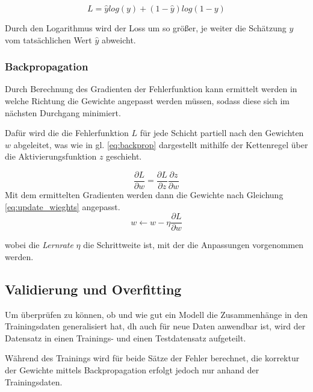  \begin{equation}
    \label{eq:crossentropy}
    L = \hat{y}log(y) + (1 - \hat{y})log(1 - y)
\end{equation}

Durch den Logarithmus wird der Loss um so größer, je weiter die Schätzung $y$ vom 
tatsächlichen Wert $\hat{y}$ abweicht.


\subsubsection{Backpropagation}

Durch Berechnung des Gradienten der Fehlerfunktion kann ermittelt 
werden in welche Richtung die Gewichte angepasst werden müssen, sodass diese sich 
im nächsten Durchgang minimiert.

Dafür wird die die Fehlerfunktion $L$ für jede Schicht partiell nach den 
Gewichten $w$ abgeleitet, was wie in gl. \ref{eq:backprop} dargestellt mithilfe der 
Kettenregel über die Aktivierungsfunktion $z$ geschieht.


\begin{equation}
    \label{eq:backprop}
    \frac{\partial L}{\partial w} = \frac{\partial L}{\partial z}\frac{\partial z}{\partial w}
\end{equation}
Mit dem ermittelten Gradienten werden dann die Gewichte nach Gleichung \ref{eq:update_wieghts} angepasst.
\begin{equation}
    \label{eq:update_wieghts}
    w  \leftarrow w - \eta \frac{\partial L}{\partial w}
\end{equation}

wobei die \textit{Lernrate} $\eta$ die Schrittweite ist, mit der die
Anpassungen vorgenommen werden.





\subsection{Validierung und Overfitting}\label{subsec:validation}

Um überprüfen zu können, ob und wie gut ein Modell die Zusammenhänge
in den Trainingsdaten generalisiert hat, dh auch für neue Daten
anwendbar ist,
wird der Datensatz in einen Trainings- und einen Testdatensatz aufgeteilt.

Während des Trainings wird für beide Sätze der Fehler berechnet, 
die korrektur der Gewichte mittels Backpropagation erfolgt
jedoch nur anhand der Trainingsdaten.

